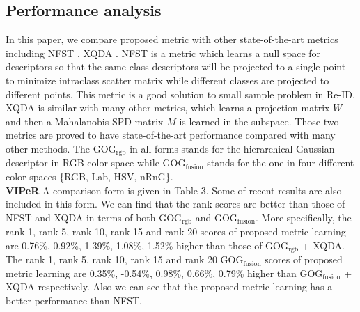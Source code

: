 \documentclass[conference,compsoc]{IEEEtran}
\begin{document}
\subsection{Performance analysis}
In this paper, we compare proposed metric with other state-of-the-art metrics including NFST \cite{NFST}, XQDA \cite{LOMO}. NFST is a metric which learns a null space for descriptors so that the same class descriptors will be projected to a single point to minimize intraclass scatter matrix while different classes are projected to different points. This metric is a good solution to small sample problem in Re-ID. XQDA is similar with many other metrics, which learns a projection matrix $W$ and then a Mahalanobis SPD matrix $M$ is learned in the subspace. Those two metrics are proved to have state-of-the-art performance compared with many other methods. The GOG$_\text{rgb}$ in all forms stands for the hierarchical Gaussian descriptor in RGB color space while GOG$_\text{fusion}$ stands for the one in four different color spaces \{RGB, Lab, HSV, nRnG\}.\\
\textbf{VIPeR} A comparison form is given in Table 3. Some of recent results are also included in this form. We can find that the rank scores are better than those of NFST and XQDA in terms of both GOG$_\text{rgb}$ and GOG$_\text{fusion}$. More specifically, the rank 1, rank 5, rank 10, rank 15 and rank 20 scores of proposed metric learning are 0.76\%, 0.92\%, 1.39\%, 1.08\%, 1.52\% higher than those of GOG$_\text{rgb}$ + XQDA. The rank 1, rank 5, rank 10, rank 15 and rank 20 GOG$_\text{fusion}$ scores of proposed metric learning are 0.35\%, -0.54\%, 0.98\%, 0.66\%, 0.79\% higher than GOG$_\text{fusion}$ + XQDA respectively. Also we can see that the proposed metric learning has a better performance than NFST. 
\end{document}
